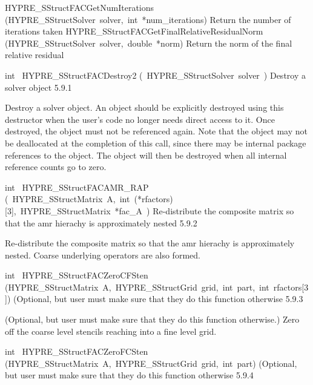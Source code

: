 \documentclass{article}
\begin{document}
\begin{cxxentry}
\begin{cxxentry}
\begin{cxxnames}
        {}
\label{cxx.5.9.23}
        {HYPRE\_SStructFACGetNumIterations}
        {(HYPRE\_SStructSolver\ solver,\ int\ *num\_iterations)}
        {
Return the number of iterations taken}
        {}
\label{cxx.5.9.24}
        {HYPRE\_SStructFACGetFinalRelativeResidualNorm}
        {(HYPRE\_SStructSolver\ solver,\ double\ *norm)}
        {
Return the norm of the final relative residual}
        {}
\label{cxx.5.9.25}
\end{cxxnames}
\begin{cxxfunction}
{int\ }
        {HYPRE\_SStructFACDestroy2}
        {(\ HYPRE\_SStructSolver\ solver\ )}
        {
Destroy a solver object}
        {5.9.1}
\begin{cxxdoc}

Destroy a solver object.  An object should be explicitly destroyed
using this destructor when the user's code no longer needs direct
access to it.  Once destroyed, the object must not be referenced
again.  Note that the object may not be deallocated at the
completion of this call, since there may be internal package
references to the object.  The object will then be destroyed when
all internal reference counts go to zero.
\end{cxxdoc}
\end{cxxfunction}
\begin{cxxfunction}
{int\ }
        {HYPRE\_SStructFACAMR\_RAP}
        {(\ HYPRE\_SStructMatrix\ A,\ int\ (*rfactors)[3],\ HYPRE\_SStructMatrix\ *fac\_A\ )}
        {
Re-distribute the composite matrix so that the amr hierachy is approximately
nested}
        {5.9.2}
\begin{cxxdoc}

Re-distribute the composite matrix so that the amr hierachy is approximately
nested. Coarse underlying operators are also formed.
\end{cxxdoc}
\end{cxxfunction}
\begin{cxxfunction}
{int\ }
        {HYPRE\_SStructFACZeroCFSten}
        {(HYPRE\_SStructMatrix\ A,\ HYPRE\_SStructGrid\ grid,\ int\ part,\ int\ rfactors[3])}
        {
(Optional, but user must make sure that they do this function otherwise}
        {5.9.3}
\begin{cxxdoc}

(Optional, but user must make sure that they do this function otherwise.)
Zero off the coarse level stencils reaching into a fine level grid.
\end{cxxdoc}
\end{cxxfunction}
\begin{cxxfunction}
{int\ }
        {HYPRE\_SStructFACZeroFCSten}
        {(HYPRE\_SStructMatrix\ A,\ HYPRE\_SStructGrid\ grid,\ int\ part)}
        {
(Optional, but user must make sure that they do this function otherwise}
        {5.9.4}
\begin{cxxdoc}


\end{cxxdoc}
\end{cxxfunction}
\end{cxxentry}
\end{cxxentry}
\end{document}
